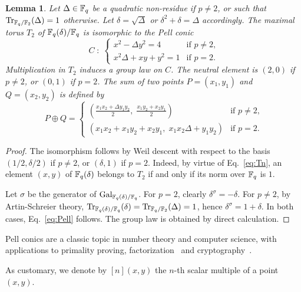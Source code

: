 \documentclass{sig-alternate}
\newtheorem{lemma}[definition]{Lemma}
\begin{document}
\begin{lemma}
  Let $\Delta\in\mathbb{F}_q$ be a quadratic non-residue if $p\ne2$, or such
  that $\operatorname{Tr}_{\mathbb{F}_q/\mathbb{F}_2}(\Delta)=1$ otherwise. Let $\delta=\sqrt{\Delta}$
  or $\delta^2+\delta=\Delta$ accordingly. The
  maximal torus $T_2$ of $\mathbb{F}_q(\delta)/\mathbb{F}_q$ is isomorphic to the
  \emph{Pell conic}
  \begin{equation}
    \label{eq:Pell}
    C \;:\; 
    \begin{cases}
      x^2 - \Delta y^2 = 4 &\text{if $p\ne2$,}\\
      x^2\Delta + xy + y^2 = 1 &\text{if $p=2$.}
    \end{cases}
  \end{equation}
  Multiplication in $T_2$ induces a group law on $C$. The neutral
  element is $(2,0)$ if $p\ne2$, or $(0,1)$ if $p=2$. The sum of two
  points $P=(x_1,y_1)$ and $Q=(x_2,y_2)$ is defined
  by
  \begin{equation*}
    P\oplus Q =
    \begin{cases}
      \displaystyle
      \left(\frac{x_1x_2 + \Delta y_1y_2}{2},\; \frac{x_1y_2 + x_2y_1}{2}\right) &
      \text{if $p\ne2$,}\\
      \left(x_1x_2 + x_1y_2 + x_2y_1,\; x_1x_2\Delta + y_1y_2\right) &
      \text{if $p=2$.}
    \end{cases}
  \end{equation*}
\end{lemma}
\begin{proof}
  The isomorphism follows by Weil descent with respect to the basis
  $(1/2,\delta/2)$ if $p\ne2$, or $(\delta,1)$ if $p=2$. Indeed, by
  virtue of Eq.~\eqref{eq:Tn}, an element $(x,y)$ of $\mathbb{F}_q(\delta)$
  belongs to $T_2$ if and only if its norm over $\mathbb{F}_q$ is $1$.

  Let $\sigma$ be the generator of $\operatorname{Gal}_{\mathbb{F}_q(\delta)/\mathbb{F}_q}$. For
  $p=2$, clearly $\delta^\sigma=-\delta$. For $p\ne2$, by
  Artin-Schreier theory,
  $\operatorname{Tr}_{\mathbb{F}_q(\delta)/\mathbb{F}_q}(\delta)=\operatorname{Tr}_{\mathbb{F}_q/\mathbb{F}_2}(\Delta)=1$, hence
  $\delta^\sigma=1+\delta$. In both cases, Eq.~\eqref{eq:Pell}
  follows.  The group law is obtained by direct calculation.
\end{proof}

Pell conics are a classic topic in number theory\cite{lenstra02-pell}
and computer science, with applications to primality proving,
factorization~\cite{lemmermeyer03,hambleton12} and
cryptography~\cite{rubin-silverberg+crypto03}. 

As customary, we denote by $[n](x,y)$ the $n$-th scalar multiple of a
point $(x,y)$.
\end{document}
